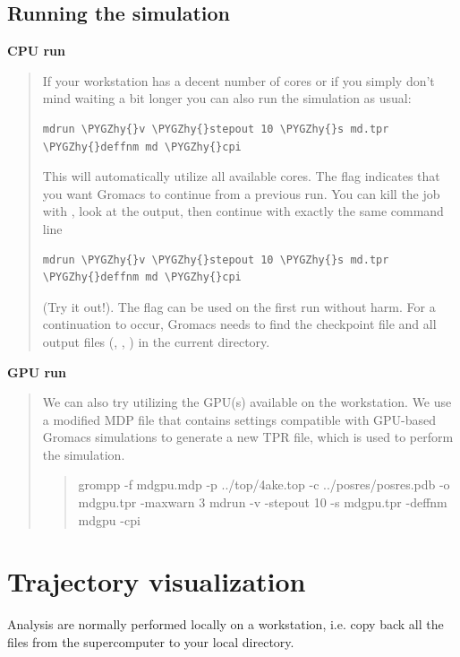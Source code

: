 \documentclass[letterpaper,10pt,english]{sphinxmanual}
\def\PYGZhy{\char`\-}
\begin{document}
\section{Running the simulation}
\label{equilibrium_MD:running-the-simulation}
\textbf{CPU run}
\begin{quote}

If your workstation has a decent number of cores or if you simply
don't mind waiting a bit longer you can also run the simulation as
usual:

\begin{Verbatim}[commandchars=\\\{\}]
mdrun \PYGZhy{}v \PYGZhy{}stepout 10 \PYGZhy{}s md.tpr \PYGZhy{}deffnm md \PYGZhy{}cpi
\end{Verbatim}

This will automatically utilize all available cores. The 
flag indicates that you want Gromacs to continue from a previous
run. You can kill the job with , look at the output,
then continue with exactly the same command line

\begin{Verbatim}[commandchars=\\\{\}]
mdrun \PYGZhy{}v \PYGZhy{}stepout 10 \PYGZhy{}s md.tpr \PYGZhy{}deffnm md \PYGZhy{}cpi
\end{Verbatim}

(Try it out!). The  flag can be used on the first run
without harm. For a continuation to occur, Gromacs needs to find the
checkpoint file  and all output files (,
, ) in the current directory.
\end{quote}

\textbf{GPU run}
\begin{quote}

We can also try utilizing the GPU(s) available on the workstation. We use
a modified MDP file that contains settings compatible with GPU-based
Gromacs simulations to generate a new TPR file, which is used to perform
the simulation.
\begin{quote}

grompp -f mdgpu.mdp -p ../top/4ake.top -c ../posres/posres.pdb -o mdgpu.tpr -maxwarn 3
mdrun -v -stepout 10 -s mdgpu.tpr -deffnm mdgpu -cpi
\end{quote}
\end{quote}


\chapter{Trajectory visualization}
\label{trajectory_visualization:phy494-phy598-chm598-simulation-approaches-to-bio-and-nanophysics}\label{trajectory_visualization:trajectory-visualization}\label{trajectory_visualization::doc}\label{trajectory_visualization:id1}
Analysis are normally performed locally on a workstation,
i.e. copy back all the files from the supercomputer to your local
directory.
\end{document}
